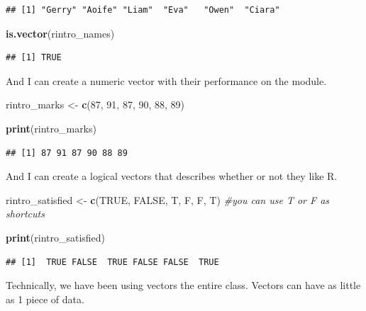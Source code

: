 \documentclass[
]{book}
\newenvironment{Shaded}{\begin{snugshade}}{\end{snugshade}}
\newcommand{\CommentTok}[1]{\textcolor[rgb]{0.56,0.35,0.01}{\textit{#1}}}
\newcommand{\ConstantTok}[1]{\textcolor[rgb]{0.56,0.35,0.01}{#1}}
\newcommand{\DecValTok}[1]{\textcolor[rgb]{0.00,0.00,0.81}{#1}}
\newcommand{\FunctionTok}[1]{\textcolor[rgb]{0.13,0.29,0.53}{\textbf{#1}}}
\newcommand{\NormalTok}[1]{#1}
\newcommand{\OtherTok}[1]{\textcolor[rgb]{0.56,0.35,0.01}{#1}}
\begin{document}
\begin{verbatim}
## [1] "Gerry" "Aoife" "Liam"  "Eva"   "Owen"  "Ciara"
\end{verbatim}

\begin{Shaded}
\begin{Highlighting}[]
\FunctionTok{is.vector}\NormalTok{(rintro\_names) }
\end{Highlighting}
\end{Shaded}

\begin{verbatim}
## [1] TRUE
\end{verbatim}

And I can create a numeric vector with their performance on the module.

\begin{Shaded}
\begin{Highlighting}[]
\NormalTok{rintro\_marks }\OtherTok{\textless{}{-}} \FunctionTok{c}\NormalTok{(}\DecValTok{87}\NormalTok{, }\DecValTok{91}\NormalTok{, }\DecValTok{87}\NormalTok{, }\DecValTok{90}\NormalTok{, }\DecValTok{88}\NormalTok{, }\DecValTok{89}\NormalTok{)}

\FunctionTok{print}\NormalTok{(rintro\_marks)}
\end{Highlighting}
\end{Shaded}

\begin{verbatim}
## [1] 87 91 87 90 88 89
\end{verbatim}

And I can create a logical vectors that describes whether or not they like R.

\begin{Shaded}
\begin{Highlighting}[]
\NormalTok{rintro\_satisfied }\OtherTok{\textless{}{-}} \FunctionTok{c}\NormalTok{(}\ConstantTok{TRUE}\NormalTok{, }\ConstantTok{FALSE}\NormalTok{, T, F, F, T) }\CommentTok{\#you can use T or F as shortcuts}

\FunctionTok{print}\NormalTok{(rintro\_satisfied)}
\end{Highlighting}
\end{Shaded}

\begin{verbatim}
## [1]  TRUE FALSE  TRUE FALSE FALSE  TRUE
\end{verbatim}

Technically, we have been using vectors the entire class. Vectors can have as little as 1 piece of data.
\end{document}
